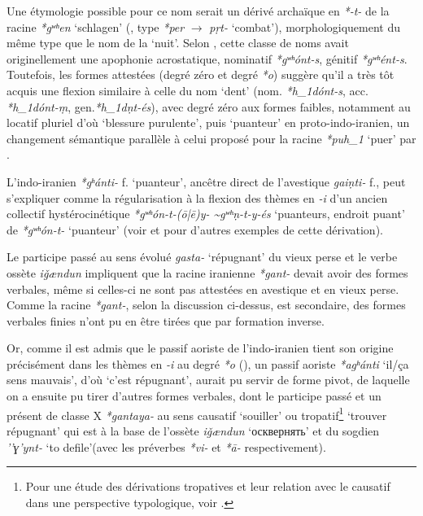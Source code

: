 \documentclass[11pt]{article}
\newcommand{\ipa}[1]{{\phon\textit{#1}}}
\newcommand{\forme}[1]{{\phon#1}}
\begin{document}
Une étymologie possible pour ce nom serait un dérivé  archaïque en \ipa{*-t-} de la racine \ipa{*gʷʰen} `schlagen' (\citealt[218]{liv}, type \ipa{*per} $\rightarrow$ \ipa{pṛt-} `combat'), morphologiquement du même type que le nom de la `nuit'. Selon \citet{schindler67nekuz}, cette classe de noms avait originellement une apophonie acrostatique, nominatif \ipa{*gʷʰónt-s}, génitif \ipa{*gʷʰént-s}. Toutefois, les formes attestées (degré zéro et degré \ipa{*o}) suggère qu'il a très tôt acquis une flexion similaire à celle du nom `dent' (nom. \ipa{*h_1dónt-s}, acc. \ipa{*h_1dónt-ṃ}, gen.\ipa{*h_1dṇt-és}), avec degré zéro aux formes faibles, notamment au locatif pluriel d'où `blessure purulente', puis `puanteur' en proto-indo-iranien, un changement sémantique parallèle à celui proposé pour la racine \ipa{*puh_1} `puer' par \citet{garnier16secondary}.
 
L'indo-iranien \ipa{*gʰánti-} f. `puanteur', ancêtre direct de l'avestique \ipa{gaiṇti-} f., peut s'expliquer comme la régularisation à la flexion des thèmes en \ipa{-i} d'un ancien collectif hystérocinétique \ipa{*gʷʰón-t-(ō|ē)y- \textasciitilde *gʷʰṇ-t-y-és} `puanteurs, endroit puant' de  \ipa{*gʷʰón-t-} `puanteur' (voir \citealt{oettinger95kollektiv} et \citealt{ garnier13ghosti} pour d'autres exemples de cette dérivation).

Le participe passé au sens évolué \ipa{gasta-} `répugnant' du vieux perse et le verbe ossète \ipa{iǧændun} impliquent que la racine iranienne \ipa{*gant-} devait avoir des formes verbales, même si celles-ci ne sont pas attestées en avestique et en vieux perse. Comme la racine \ipa{*gant-}, selon la discussion ci-dessus, est secondaire, des formes verbales finies n'ont pu en être tirées que par formation inverse. 

Or, comme il est admis que le passif aoriste de l'indo-iranien tient son origine précisément dans les thèmes en \ipa{-i} au degré \ipa{*o} (\citealt[15]{kummel96stativ}), un passif aoriste \ipa{*agʰánti} `il/ça sens mauvais', d'où `c'est répugnant', aurait pu servir de forme pivot, de laquelle on a ensuite pu tirer d'autres formes verbales, dont le participe passé et un présent de classe X \ipa{*gantaya-} au sens causatif `souiller' ou tropatif\footnote{Pour une étude des dérivations tropatives et leur relation avec le causatif dans une perspective typologique, voir \citet{jacques13tropative}.} `trouver répugnant' qui est à la base de l'ossète \ipa{iǧændun} `\forme{осквернять}' et du sogdien \ipa{’’ɣ’ynt-} ‘to defile'(avec les préverbes \ipa{*vi-} et \ipa{*ā-} respectivement).
\end{document}
